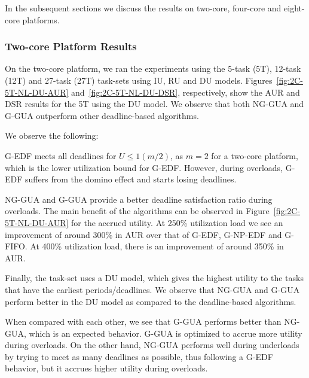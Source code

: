 \documentclass[12pt,dvips]{report}
\begin{document}
In the subsequent sections we discuss the results on two-core, four-core and eight-core platforms.

\subsubsection{Two-core Platform Results}

On the two-core platform, we ran the experiments using the 5-task (5T), 12-task (12T) and 27-task (27T) task-sets using IU, RU and DU models. Figures~\ref{fig:2C-5T-NL-DU-AUR} and~\ref{fig:2C-5T-NL-DU-DSR}, respectively, show the AUR and DSR results for the 5T using the DU model. We observe that both NG-GUA and G-GUA outperform other deadline-based algorithms.

We observe the following:
\begin{asparaenum}[(1)]
	\item G-EDF meets all deadlines for $U \le 1 (m/2)$, as $m = 2$ for a two-core platform, which is the lower utilization bound for G-EDF. However, during overloads, G-EDF suffers from the domino effect and starts losing deadlines.
	\item NG-GUA and G-GUA provide a better deadline satisfaction ratio during overloads. The main benefit of the algorithms can be observed in Figure~\ref{fig:2C-5T-NL-DU-AUR} for the accrued utility. At 250\% utilization load we see an improvement of around 300\% in AUR over that of G-EDF, G-NP-EDF and G-FIFO. At 400\% utilization load, there is an improvement of around 350\% in AUR.
	\item Finally, the task-set uses a DU model, which gives the highest utility to the tasks that have the earliest periods/deadlines. We observe that NG-GUA and G-GUA perform better in the DU model as compared to the deadline-based algorithms.
\end{asparaenum}
When compared with each other, we see that G-GUA performs better than NG-GUA, which is an expected behavior. G-GUA is optimized to accrue more utility during overloads. On the other hand, NG-GUA performs well during underloads by trying to meet as many deadlines as possible, thus following a G-EDF behavior, but it accrues higher utility during overloads. 
\end{document}
